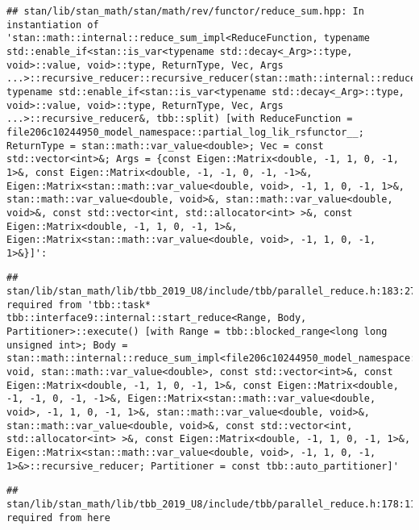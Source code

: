 \documentclass[
]{article}
\begin{document}
\begin{verbatim}
## stan/lib/stan_math/stan/math/rev/functor/reduce_sum.hpp: In instantiation of 'stan::math::internal::reduce_sum_impl<ReduceFunction, typename std::enable_if<stan::is_var<typename std::decay<_Arg>::type, void>::value, void>::type, ReturnType, Vec, Args ...>::recursive_reducer::recursive_reducer(stan::math::internal::reduce_sum_impl<ReduceFunction, typename std::enable_if<stan::is_var<typename std::decay<_Arg>::type, void>::value, void>::type, ReturnType, Vec, Args ...>::recursive_reducer&, tbb::split) [with ReduceFunction = file206c10244950_model_namespace::partial_log_lik_rsfunctor__; ReturnType = stan::math::var_value<double>; Vec = const std::vector<int>&; Args = {const Eigen::Matrix<double, -1, 1, 0, -1, 1>&, const Eigen::Matrix<double, -1, -1, 0, -1, -1>&, Eigen::Matrix<stan::math::var_value<double, void>, -1, 1, 0, -1, 1>&, stan::math::var_value<double, void>&, stan::math::var_value<double, void>&, const std::vector<int, std::allocator<int> >&, const Eigen::Matrix<double, -1, 1, 0, -1, 1>&, Eigen::Matrix<stan::math::var_value<double, void>, -1, 1, 0, -1, 1>&}]':
\end{verbatim}

\begin{verbatim}
## stan/lib/stan_math/lib/tbb_2019_U8/include/tbb/parallel_reduce.h:183:27:   required from 'tbb::task* tbb::interface9::internal::start_reduce<Range, Body, Partitioner>::execute() [with Range = tbb::blocked_range<long long unsigned int>; Body = stan::math::internal::reduce_sum_impl<file206c10244950_model_namespace::partial_log_lik_rsfunctor__, void, stan::math::var_value<double>, const std::vector<int>&, const Eigen::Matrix<double, -1, 1, 0, -1, 1>&, const Eigen::Matrix<double, -1, -1, 0, -1, -1>&, Eigen::Matrix<stan::math::var_value<double, void>, -1, 1, 0, -1, 1>&, stan::math::var_value<double, void>&, stan::math::var_value<double, void>&, const std::vector<int, std::allocator<int> >&, const Eigen::Matrix<double, -1, 1, 0, -1, 1>&, Eigen::Matrix<stan::math::var_value<double, void>, -1, 1, 0, -1, 1>&>::recursive_reducer; Partitioner = const tbb::auto_partitioner]'
\end{verbatim}

\begin{verbatim}
## stan/lib/stan_math/lib/tbb_2019_U8/include/tbb/parallel_reduce.h:178:11:   required from here
\end{verbatim}
\end{document}
